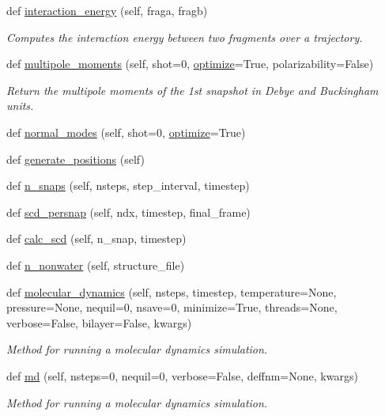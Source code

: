 \begin{DoxyCompactItemize}
def \hyperlink{classsrc_1_1gmxio_1_1GMX_a1374e65cac6409dfde7e90b110f4c599}{interaction\+\_\+energy} (self, fraga, fragb)
\begin{DoxyCompactList}\small\item\em Computes the interaction energy between two fragments over a trajectory. \end{DoxyCompactList}\item 
def \hyperlink{classsrc_1_1gmxio_1_1GMX_a28111ac260dc9abee6f9f9e9bfaa8332}{multipole\+\_\+moments} (self, shot=0, \hyperlink{classsrc_1_1gmxio_1_1GMX_a92d0a874a4b720617b984cfb3f3117cf}{optimize}=True, polarizability=False)
\begin{DoxyCompactList}\small\item\em Return the multipole moments of the 1st snapshot in Debye and Buckingham units. \end{DoxyCompactList}\item 
def \hyperlink{classsrc_1_1gmxio_1_1GMX_adbb731b653e4f79880ee97a67d128805}{normal\+\_\+modes} (self, shot=0, \hyperlink{classsrc_1_1gmxio_1_1GMX_a92d0a874a4b720617b984cfb3f3117cf}{optimize}=True)
\item 
def \hyperlink{classsrc_1_1gmxio_1_1GMX_a414ad54bca72f823dee0cb5239cc8e58}{generate\+\_\+positions} (self)
\item 
def \hyperlink{classsrc_1_1gmxio_1_1GMX_a1dd15e453829991f85a8cc4798425813}{n\+\_\+snaps} (self, nsteps, step\+\_\+interval, timestep)
\item 
def \hyperlink{classsrc_1_1gmxio_1_1GMX_a8aeaf687eee94c8da3fb33c1e22802d6}{scd\+\_\+persnap} (self, ndx, timestep, final\+\_\+frame)
\item 
def \hyperlink{classsrc_1_1gmxio_1_1GMX_a1dfcbef267b12f239d0670ecbe1f41d8}{calc\+\_\+scd} (self, n\+\_\+snap, timestep)
\item 
def \hyperlink{classsrc_1_1gmxio_1_1GMX_a6a18f06050c5b64ef2c88fc8ee40d107}{n\+\_\+nonwater} (self, structure\+\_\+file)
\item 
def \hyperlink{classsrc_1_1gmxio_1_1GMX_abab1e48b2b3d25277b9f4392807938ae}{molecular\+\_\+dynamics} (self, nsteps, timestep, temperature=None, pressure=None, nequil=0, nsave=0, minimize=True, threads=None, verbose=False, bilayer=False, kwargs)
\begin{DoxyCompactList}\small\item\em Method for running a molecular dynamics simulation. \end{DoxyCompactList}\item 
def \hyperlink{classsrc_1_1gmxio_1_1GMX_a3133906ca908cb9a5e6fc816460ec498}{md} (self, nsteps=0, nequil=0, verbose=False, deffnm=None, kwargs)
\begin{DoxyCompactList}\small\item\em Method for running a molecular dynamics simulation. \end{DoxyCompactList}\end{DoxyCompactItemize}
